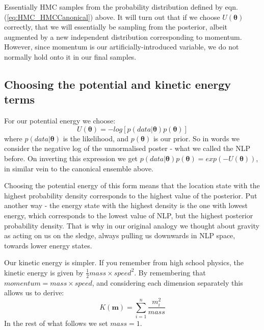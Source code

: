 \documentclass[11pt,fullpage]{book}
\begin{document}
Essentially HMC samples from the probability distribution defined by eqn. (\ref{eq:HMC_HMCCanonical}) above. It will turn out that if we choose $U(\boldsymbol{\theta})$ correctly, that we will essentially be sampling from the posterior, albeit augmented by a new independent distribution corresponding to momentum. However, since momentum is our artificially-introduced variable, we do not normally hold onto it in our final samples.

\subsection{Choosing the potential and kinetic energy terms}
For our potential energy  we choose:
%
\begin{equation}
U(\boldsymbol{\theta}) = - log[p(data|\boldsymbol{\theta})p(\boldsymbol{\theta})]
\end{equation}
%
where $p(data|\boldsymbol{\theta})$ is the likelihood, and $p(\boldsymbol{\theta})$ is our prior. So in words we consider the negative log of the unnormalised poster - what we called the NLP before. On inverting this expression we get $p(data|\boldsymbol{\theta})p(\boldsymbol{\theta})=exp(-U(\boldsymbol{\theta}))$, in similar vein to the canonical ensemble above.

Choosing the potential energy of this form means that the location state with the highest probability density corresponds to the highest value of the posterior. Put another way - the energy state with the highest density is the one with lowest energy, which corresponds to the lowest value of NLP, but the highest posterior probability density. That is why in our original analogy we thought about gravity as acting on us on the sledge, always pulling us downwards in NLP space, towards lower energy states. 

Our kinetic energy is simpler. If you remember from high school physics, the kinetic energy is given by $\frac{1}{2} mass \times speed^2$. By remembering that $momentum=mass \times speed$, and considering each dimension separately this allows us to derive:
%
\begin{equation}\label{eq:HMC_KE}
K(\boldsymbol{m}) =\sum\limits_{i=1}^{n}\frac{m_i^2}{mass}
\end{equation}
%
In the rest of what follows we set $mass=1$.
\end{document}
